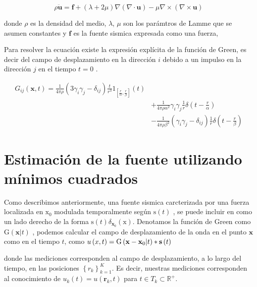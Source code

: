 $$\rho\ddot{\mathbf{u}}=\mathbf{f}+\left(\lambda+2\mu\right)\nabla\left(\nabla\cdot\mathbf{u}\right)-\mu\nabla\times\left(\nabla\times\mathbf{u}\right)$$
 

donde $\rho$ es la densidad del medio, $\lambda$, $\mu$ son los parámtros de
Lamme que se asumen constantes y $\mathbf{f}$ es la fuente sismica expresada
como una fuerza,

Para resolver la ecuación existe la expresión explícita de la función de Green,
es decir del campo de desplazamiento en la dirección $i$ debido a un impulso en
la dirección $j$ en el tiempo $t=0$ .

\begin{equation}
\begin{split}
G_{ij}\left(\mathbf{x},t\right)
=
\frac{1}{4\pi\rho}\left(3\gamma_{i}\gamma_{j}-\delta_{ij}\right)\frac{t}{r^{3}}1_{\left[\frac{r}{\alpha},\frac{r}{\beta}\right]}\left(t\right)
\\
&
+\frac{1}{4\pi\rho\alpha^{2}}\gamma_{i}\gamma_{j}\frac{1}{r}\delta\left(t-\frac{r}{\alpha}\right)
\\&
-\frac{1}{4\pi\rho\beta^{2}}\left(\gamma_{i}\gamma_{j}-\delta_{ij}\right)\frac{1}{r}\delta\left(t-\frac{r}{\beta}\right)
\end{split}
\end{equation} 

\section{Estimación de la fuente utilizando mínimos cuadrados}

Como describimos anteriormente, una fuente sismica carcterizada por una fuerza
localizada en $\mbox{x}_{0}$ modulada temporalmente según
$\mbox{s}\left(t\right)$ , se puede incluir en como un lado
derecho de la forma
$\mbox{s}\left(t\right)\delta_{\mathbf{x}_{0}}\left(\mbox{x}\right)$. Denotamos
la función de Green como $\mbox{G}\left(\mathbf{x}|t\right)$ , podemos calcular
el campo de desplazamiento de la onda en el punto $\mathbf{x}$ como en el tiempo
$t$, como
$u\left(x,t\right)=\mbox{G}\left(\mbox{\textbf{x}}-\mathbf{x}_{0}|t\right)\ast\mathbf{s}\left(t\right)$
 

donde las mediciones corresponden al campo de desplazamiento, a lo largo del
tiempo, en las posiciones $\left\{ r_{k}\right\} _{k=1}^{K}$. Es decir, nuestras
mediciones corresponden al conocimiento de
$u_{k}\left(t\right) = u\left(\mathbf{r}_{k},t\right)$ para
$t \in T_{k}\subset\mathbb{R}^{+}$.

